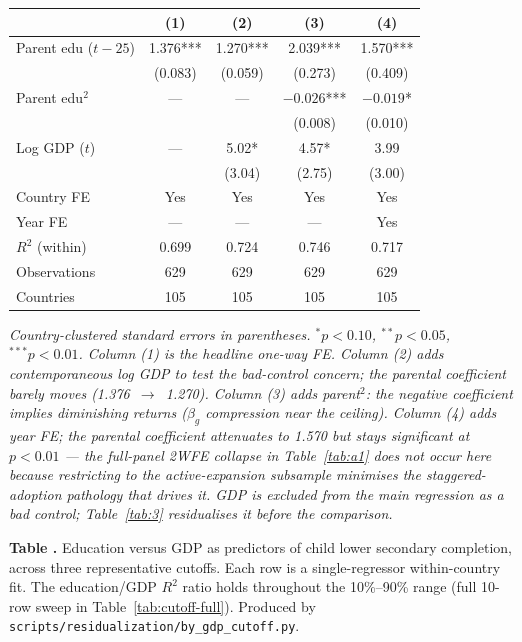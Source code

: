 \documentclass[12pt,letterpaper]{article}
\begin{document}
\begin{longtable}[]{@{}lcccc@{}}
\toprule
 & (1) & (2) & (3) & (4) \\
\midrule
\endhead
Parent edu ($t-25$)   & 1.376*** & 1.270*** & 2.039*** & 1.570*** \\
                      & (0.083)  & (0.059)  & (0.273)  & (0.409)  \\
Parent edu$^2$        &   ---    &   ---    & $-0.026$***  & $-0.019$*    \\
                      &          &          & (0.008)  & (0.010)  \\
Log GDP ($t$)         &   ---    & 5.02*    & 4.57*    & 3.99     \\
                      &          & (3.04)   & (2.75)   & (3.00)   \\
\midrule
Country FE            & Yes      & Yes      & Yes      & Yes      \\
Year FE               & ---      & ---      & ---      & Yes      \\
$R^2$ (within)        & 0.699    & 0.724    & 0.746    & 0.717    \\
Observations          & 629      & 629      & 629      & 629      \\
Countries             & 105      & 105      & 105      & 105      \\
\bottomrule
\end{longtable}

\emph{Country-clustered standard errors in parentheses.
$^{*}\!p<0.10$, $^{**}\!p<0.05$, $^{***}\!p<0.01$. Column (1) is the
headline one-way FE. Column (2) adds contemporaneous log GDP to test the
bad-control concern; the parental coefficient barely moves
(1.376~$\rightarrow$~1.270). Column (3) adds parent$^2$: the negative
coefficient implies diminishing returns ($\beta_g$ compression near the
ceiling). Column (4) adds year FE; the parental coefficient attenuates
to 1.570 but stays significant at $p<0.01$ --- the full-panel 2WFE
collapse in Table~\ref{tab:a1} does not occur here because
restricting to the active-expansion subsample minimises the
staggered-adoption pathology that drives it. GDP is excluded from
the main regression as a bad control; Table~\ref{tab:3} residualises
it before the comparison.}

\label{tab:cutoff}\textbf{Table \thetable.} Education
versus GDP as predictors of child lower secondary completion, across
three representative cutoffs. Each row is a single-regressor within-country
fit. The education/GDP $R^2$ ratio holds throughout the 10\%--90\% range
(full 10-row sweep in Table~\ref{tab:cutoff-full}).
Produced by \texttt{scripts/residualization/by\_gdp\_cutoff.py}.
\end{document}
